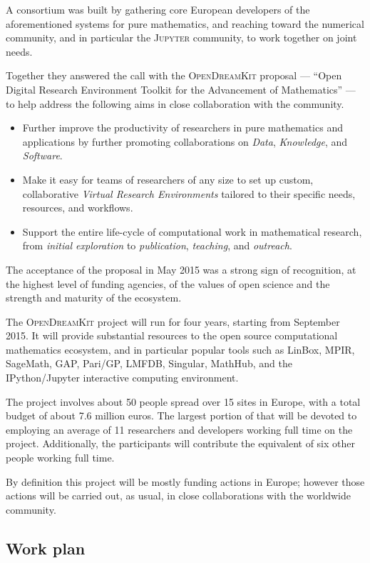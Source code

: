 \documentclass{llncs}
\newcommand{\software}[1]{\textsc{#1}\xspace}
\newcommand{\Jupyter}{\software{Jupyter}}
\newcommand{\ODK}{\software{OpenDreamKit}}
\begin{document}
A consortium was built by gathering core European developers of the
aforementioned systems for pure mathematics, and reaching toward the
numerical community, and in particular the \Jupyter community, to work
together on joint needs.

Together they answered the call with the \ODK proposal --- ``Open
Digital Research Environment Toolkit for the Advancement of
Mathematics'' --- to help address the following aims in close
collaboration with the community.

\begin{itemize}
\item Further improve the productivity of researchers in pure
  mathematics and applications by further promoting collaborations on
  \emph{Data}, \emph{Knowledge}, and \emph{Software}.
\item Make it easy for teams of researchers of any size to set up custom,
  collaborative \emph{Virtual Research Environments} tailored to their
  specific needs, resources, and workflows.
\item Support the entire life-cycle of computational work in
  mathematical research, from \emph{initial exploration} to
  \emph{publication}, \emph{teaching}, and \emph{outreach}.
\end{itemize}

The acceptance of the proposal in May 2015 was a strong sign of
recognition, at the highest level of funding agencies, of the values
of open science and the strength and maturity of the ecosystem.

The \ODK project will run for four years, starting from September
2015. It will provide substantial resources to the open source
computational mathematics ecosystem, and in particular popular tools
such as LinBox, MPIR, SageMath, GAP, Pari/GP, LMFDB, Singular,
MathHub, and the IPython/Jupyter interactive computing environment.

The project involves about 50 people spread over 15 sites in Europe,
with a total budget of about 7.6 million euros. The largest portion of
that will be devoted to employing an average of 11 researchers and
developers working full time on the project. Additionally, the
participants will contribute the equivalent of six other people
working full time.

By definition this project will be mostly funding actions in Europe;
however those actions will be carried out, as usual, in close
collaborations with the worldwide community.

\subsection{Work plan}
\end{document}
